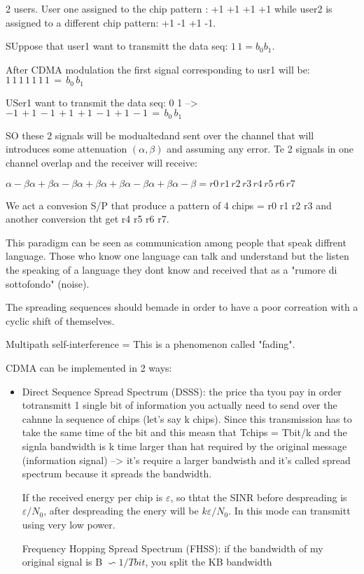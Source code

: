 2 users. User one assigned to the chip pattern : +1 +1 +1 +1 while user2 is assigned to a different chip pattern: +1 -1 +1 -1.

SUppose that user1 want to transmitt the data seq: $1\, 1 = b_0 b_1$.

After CDMA modulation the first signal corresponding to usr1 will be: $1\,1\,1\,1\,1\,1\,1\,=\,b_0\,b_1$

USer1 want to transmit the data seq: 0 1 --> $-1\,+1\,-1\,+1\,+1\,-1\,+1\,-1\,=\,b_0\,b_1$

SO these 2 signals will be modualtedand sent over the channel that will introduces some attenuation $(\alpha, \beta)$ and assuming any error. Te 2 signals in one channel overlap and the receiver will receive:

$\alpha - \beta \alpha + \beta \alpha - \beta \alpha + \beta \alpha + \beta \alpha - \beta \alpha + \beta \alpha - \beta = r0\, r1\, r2\, r3\, r4\, r5\, r6\, r7$

We act a convesion S/P that produce a pattern of 4 chips = r0 r1 r2 r3 and another conversion tht get r4 r5 r6 r7. 

This paradigm can be seen as communication among people that speak diffrent language. Those who know one language can talk and understand but the listen the speaking of a language they dont know and received that as a "rumore di sottofondo" (noise). 

The spreading sequences should bemade in order to have a poor correation with a cyclic shift of themselves. 



Multipath self-interference = This is a phenomenon called "fading".



CDMA can be implemented in 2 ways: 
\begin{itemize}
\item Direct Sequence Spread Spectrum (DSSS): the price tha tyou pay in order totransmitt 1 single bit of information you actually need to send over the cahnne la sequence of chips (let's say k chips). Since this transmission has to take the same time of the bit and this measn that Tchips = Tbit/k and the signla bandwidth is k time larger than hat required by the original message (information signal) --> it's require a larger bandwisth and it's called spread spectrum because it spreads the bandwidth.    

If the received energy per chip is $\varepsilon$, so thtat the SINR before despreading is $\varepsilon/N_0$, after despreading the enery will be $k\varepsilon/N_0$. In this mode can transmitt using very low power. 

Frequency Hopping Spread Spectrum (FHSS): if the bandwidth of my original signal is B $\backsim 1/Tbit$, you split the KB bandwidth    
\end{itemize}

